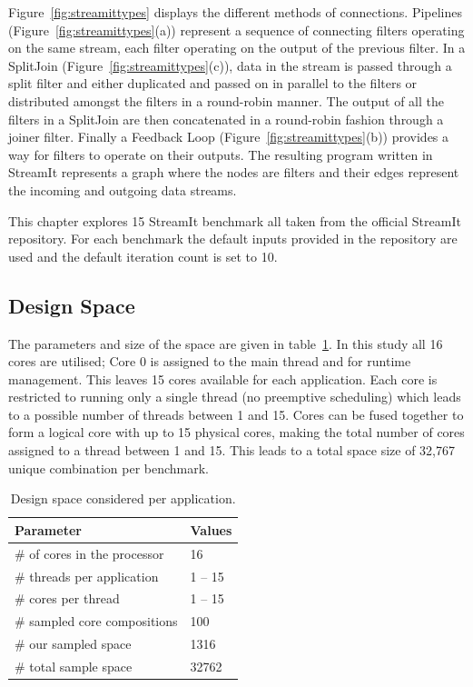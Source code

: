 Figure~\ref{fig:streamittypes} displays the different methods of connections.
Pipelines (Figure~\ref{fig:streamittypes}(a)) represent a sequence of connecting filters operating on the same stream, each filter operating on the output of the previous filter.
In a SplitJoin (Figure~\ref{fig:streamittypes}(c)), data in the stream is passed through a split filter and either duplicated and passed on in parallel to the filters or distributed amongst the filters in a round-robin manner.
The output of all the filters in a SplitJoin are then concatenated in a round-robin fashion through a joiner filter.
Finally a Feedback Loop (Figure~\ref{fig:streamittypes}(b)) provides a way for filters to operate on their outputs.
The resulting program written in StreamIt represents a graph where the nodes are filters and their edges represent the incoming and outgoing data streams.

This chapter explores 15 StreamIt benchmark  all taken from the official StreamIt repository.
For each benchmark the default inputs provided in the repository are used and the default iteration count is set to 10. 

\subsection{Design Space}

The parameters and size of the space are given in table~\ref{tab:space}.
In this study all 16 cores are utilised; Core 0 is assigned to the main thread and for runtime management. 
This leaves 15 cores available for each application.
Each core is restricted to running only a single thread (no preemptive scheduling) which leads to a possible number of threads between 1 and 15.
Cores can be fused together to form a logical core with up to 15 physical cores, making the total number of cores assigned to a thread between 1 and 15.
This leads to a total space size of 32,767 unique combination per benchmark.

\begin{table}
\centering
\begin{tabular} { p{5.2cm}  p{1.8cm} }
      \toprule
      \textbf{Parameter} & \textbf{Values} \\ \midrule
      \# of cores in the processor & 16 \\
      \# threads per application & 1 -- 15 \\
      \# cores per thread & 1 -- 15 \\ \midrule
      \# sampled core compositions & 100 \\ 
      \# our sampled space & 1316 \\
      \# total sample space & 32762 \\ \bottomrule
    \end{tabular}
  \caption{Design space considered per application.}
  \label{tab:space}
\end{table}
